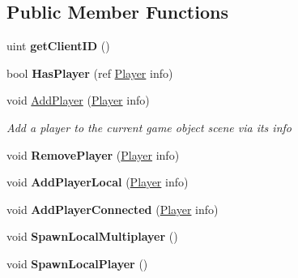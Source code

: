 \subsection*{Public Member Functions}
\begin{DoxyCompactItemize}
\item 
\hypertarget{class_game_state_acb29bf839b1e63d24a9d2c0dad60db28}{uint {\bfseries get\-Client\-I\-D} ()}\label{class_game_state_acb29bf839b1e63d24a9d2c0dad60db28}

\item 
\hypertarget{class_game_state_a05acc40696378ba026165a2cc824acf0}{bool {\bfseries Has\-Player} (ref \hyperlink{class_game_state_1_1_player}{Player} info)}\label{class_game_state_a05acc40696378ba026165a2cc824acf0}

\item 
void \hyperlink{class_game_state_a4c4e32237639764263332c7c236974d1}{Add\-Player} (\hyperlink{class_game_state_1_1_player}{Player} info)
\begin{DoxyCompactList}\small\item\em Add a player to the current game object scene via its info \end{DoxyCompactList}\item 
\hypertarget{class_game_state_ae8d21ce826daada0dabeadd11c6eb233}{void {\bfseries Remove\-Player} (\hyperlink{class_game_state_1_1_player}{Player} info)}\label{class_game_state_ae8d21ce826daada0dabeadd11c6eb233}

\item 
\hypertarget{class_game_state_a1e3c3340e55693af1c8326879a81f1c4}{void {\bfseries Add\-Player\-Local} (\hyperlink{class_game_state_1_1_player}{Player} info)}\label{class_game_state_a1e3c3340e55693af1c8326879a81f1c4}

\item 
\hypertarget{class_game_state_a2e6cdef311e93ec46d07206d621f6837}{void {\bfseries Add\-Player\-Connected} (\hyperlink{class_game_state_1_1_player}{Player} info)}\label{class_game_state_a2e6cdef311e93ec46d07206d621f6837}

\item 
\hypertarget{class_game_state_a61e4817740bd283ce4a6ea44e0d0f00a}{void {\bfseries Spawn\-Local\-Multiplayer} ()}\label{class_game_state_a61e4817740bd283ce4a6ea44e0d0f00a}

\item 
\hypertarget{class_game_state_a82b88c45043a403441d3eef1e0b72266}{void {\bfseries Spawn\-Local\-Player} ()}\label{class_game_state_a82b88c45043a403441d3eef1e0b72266}


\end{DoxyCompactItemize}
